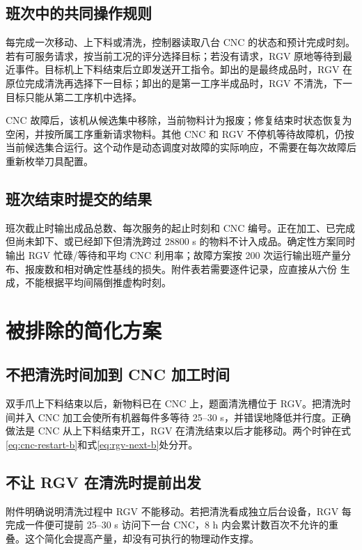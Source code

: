 \documentclass[UTF8,11pt,a4paper]{ctexart}
\begin{document}
\subsection{班次中的共同操作规则}

每完成一次移动、上下料或清洗，控制器读取八台 CNC 的状态和预计完成时刻。若有可服务请求，按当前工况的评分选择目标；若没有请求，RGV 原地等待到最近事件。目标机上下料结束后立即发送开工指令。卸出的是最终成品时，RGV 在原位完成清洗再选择下一目标；卸出的是第一工序半成品时，RGV 不清洗，下一目标只能从第二工序机中选择。

CNC 故障后，该机从候选集中移除，当前物料计为报废；修复结束时状态恢复为空闲，并按所属工序重新请求物料。其他 CNC 和 RGV 不停机等待故障机，仍按当前候选集合运行。这个动作是动态调度对故障的实际响应，不需要在每次故障后重新枚举刀具配置。

\subsection{班次结束时提交的结果}

班次截止时输出成品总数、每次服务的起止时刻和 CNC 编号。正在加工、已完成但尚未卸下、或已经卸下但清洗跨过 28800 s 的物料不计入成品。确定性方案同时输出 RGV 忙碌/等待和平均 CNC 利用率；故障方案按 200 次运行输出班产量分布、报废数和相对确定性基线的损失。附件表若需要逐件记录，应直接从六份  生成，不能根据平均间隔倒推虚构时刻。

\section{被排除的简化方案}

\subsection{不把清洗时间加到 CNC 加工时间}

双手爪上下料结束以后，新物料已在 CNC 上，题面清洗槽位于 RGV。把清洗时间并入 CNC 加工会使所有机器每件多等待 25--30 s，并错误地降低并行度。正确做法是 CNC 从上下料结束开工，RGV 在清洗结束以后才能移动。两个时钟在式\eqref{eq:cnc-restart-b}和式\eqref{eq:rgv-next-b}处分开。

\subsection{不让 RGV 在清洗时提前出发}

附件明确说明清洗过程中 RGV 不能移动。若把清洗看成独立后台设备，RGV 每完成一件便可提前 25--30 s 访问下一台 CNC，8 h 内会累计数百次不允许的重叠。这个简化会提高产量，却没有可执行的物理动作支撑。
\end{document}
